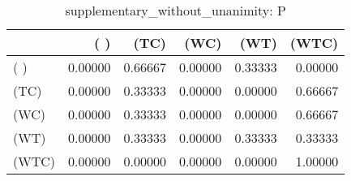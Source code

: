 \begin{table}
\centering
\caption{supplementary_without_unanimity: P}
\begin{tabular}{lrrrrr}
\toprule
{} &     ( ) &    (TC) &    (WC) &    (WT) &   (WTC) \\
\midrule
( )   & 0.00000 & 0.66667 & 0.00000 & 0.33333 & 0.00000 \\
(TC)  & 0.00000 & 0.33333 & 0.00000 & 0.00000 & 0.66667 \\
(WC)  & 0.00000 & 0.33333 & 0.00000 & 0.00000 & 0.66667 \\
(WT)  & 0.00000 & 0.33333 & 0.00000 & 0.33333 & 0.33333 \\
(WTC) & 0.00000 & 0.00000 & 0.00000 & 0.00000 & 1.00000 \\
\bottomrule
\end{tabular}
\end{table}
